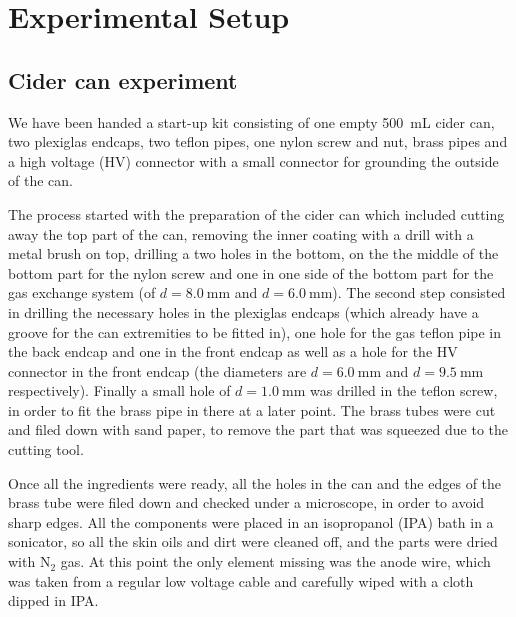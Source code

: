\section{Experimental Setup}
\subsection{Cider can experiment}
We have been handed a start-up kit consisting of one empty \SI{500}{\milli\liter}
cider can, two plexiglas endcaps, two teflon pipes, one nylon screw and nut,
brass pipes and a high voltage (HV) connector with a small connector for
grounding the outside of the can.

The process started with the preparation of the cider can which included cutting
away the top part of the can, removing the inner coating with a drill with a
metal brush on top, drilling a two holes in the bottom, on the the middle of the
bottom part for the nylon screw and one in one side of the bottom part for the
gas exchange system (of $d = \SI{8.0}{\milli\meter}$ and $d =
\SI{6.0}{\milli\meter}$). The second step consisted in drilling the necessary
holes in the plexiglas endcaps (which already have a groove for the can
extremities to be fitted in), one hole for the gas teflon pipe in the back
endcap and one in the front endcap as well as a hole for the HV connector in the
front endcap (the diameters are $d = \SI{6.0}{\milli\meter}$ and $d =
\SI{9.5}{\milli\meter}$ respectively). Finally a small hole of $d =
\SI{1.0}{\milli\meter}$ was drilled in the teflon screw, in order to fit the
brass pipe in there at a later point. The brass tubes were cut and filed down
with sand paper, to remove the part that was squeezed due to the cutting tool.

Once all the ingredients were ready, all the holes in the can and the edges of
the brass tube were filed down and checked under a microscope, in order to avoid
sharp edges. All the components were placed in an isopropanol (IPA) bath in a
sonicator, so all the skin oils and dirt were cleaned off, and the parts were
dried with $\mathrm{N}_2$ gas. At this point the only element missing was the
anode wire, which was taken from a regular low voltage cable and carefully wiped
with a cloth dipped in IPA.



